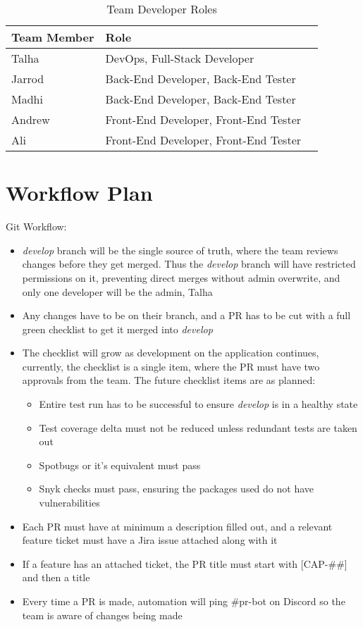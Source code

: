 \documentclass{article}
\begin{document}
\begin{table}[hp]
\caption{Team Developer Roles} \label{TblDevRoles}
\begin{tabularx}{\textwidth}{llX}
\toprule
\textbf{Team Member} & \textbf{Role}\\
\midrule
Talha & DevOps, Full-Stack Developer\\
Jarrod & Back-End Developer, Back-End Tester\\
Madhi & Back-End Developer, Back-End Tester\\
Andrew & Front-End Developer, Front-End Tester\\
Ali & Front-End Developer, Front-End Tester\\
\bottomrule
\end{tabularx}
\end{table}

\section{Workflow Plan}
Git Workflow: 
\begin{itemize}
	\item \emph{develop} branch will be the single source of truth, where the team reviews changes before they get merged. Thus the \emph{develop} branch will have restricted permissions on it, preventing direct merges without admin overwrite, and only one developer will be the admin, Talha
	\item Any changes have to be on their branch, and a PR has to be cut with a full green checklist to get it merged into \emph{develop}
	\item The checklist will grow as development on the application continues, currently, the checklist is a single item, where the PR must have two approvals from the team. The future checklist items are as planned:
	\begin{itemize}
		\item Entire test run has to be successful to ensure \emph{develop} is in a healthy state
		\item Test coverage delta must not be reduced unless redundant tests are taken out
		\item Spotbugs or it's equivalent must pass
		\item Snyk checks must pass, ensuring the packages used do not have vulnerabilities
	\end{itemize}
	\item Each PR must have at minimum a description filled out, and a relevant feature ticket must have a Jira issue attached along with it
	\item If a feature has an attached ticket, the PR title must start with [CAP-\#\#] and then a title
	\item Every time a PR is made, automation will ping \#{}pr-bot on Discord so the team is aware of changes being made
\end{itemize}
\end{document}

